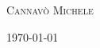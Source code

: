 \begin{titlepage}
   
    \vspace{0.5\baselineskip} %
    
    {\scshape\Large Cannavò Michele} %
    

    
    \vfill %
    
    
    
    \vspace{0.3\baselineskip} %
    
   \today%
    
\end{titlepage}
